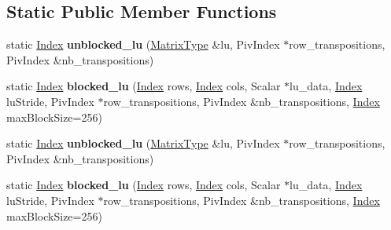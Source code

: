 \subsection*{Static Public Member Functions}
\begin{DoxyCompactItemize}
\item 
\mbox{\label{struct_eigen_1_1internal_1_1partial__lu__impl_abbae34180cea8ab2f3cee5def899d9fc}} 
static \hyperlink{namespace_eigen_a62e77e0933482dafde8fe197d9a2cfde}{Index} {\bfseries unblocked\+\_\+lu} (\hyperlink{group___core___module_class_eigen_1_1_block}{Matrix\+Type} \&lu, Piv\+Index $\ast$row\+\_\+transpositions, Piv\+Index \&nb\+\_\+transpositions)
\item 
\mbox{\label{struct_eigen_1_1internal_1_1partial__lu__impl_ab66f4cb2c3942d9c5a09aa4a26a15349}} 
static \hyperlink{namespace_eigen_a62e77e0933482dafde8fe197d9a2cfde}{Index} {\bfseries blocked\+\_\+lu} (\hyperlink{namespace_eigen_a62e77e0933482dafde8fe197d9a2cfde}{Index} rows, \hyperlink{namespace_eigen_a62e77e0933482dafde8fe197d9a2cfde}{Index} cols, Scalar $\ast$lu\+\_\+data, \hyperlink{namespace_eigen_a62e77e0933482dafde8fe197d9a2cfde}{Index} lu\+Stride, Piv\+Index $\ast$row\+\_\+transpositions, Piv\+Index \&nb\+\_\+transpositions, \hyperlink{namespace_eigen_a62e77e0933482dafde8fe197d9a2cfde}{Index} max\+Block\+Size=256)
\item 
\mbox{\label{struct_eigen_1_1internal_1_1partial__lu__impl_abbae34180cea8ab2f3cee5def899d9fc}} 
static \hyperlink{namespace_eigen_a62e77e0933482dafde8fe197d9a2cfde}{Index} {\bfseries unblocked\+\_\+lu} (\hyperlink{group___core___module_class_eigen_1_1_block}{Matrix\+Type} \&lu, Piv\+Index $\ast$row\+\_\+transpositions, Piv\+Index \&nb\+\_\+transpositions)
\item 
\mbox{\label{struct_eigen_1_1internal_1_1partial__lu__impl_ab66f4cb2c3942d9c5a09aa4a26a15349}} 
static \hyperlink{namespace_eigen_a62e77e0933482dafde8fe197d9a2cfde}{Index} {\bfseries blocked\+\_\+lu} (\hyperlink{namespace_eigen_a62e77e0933482dafde8fe197d9a2cfde}{Index} rows, \hyperlink{namespace_eigen_a62e77e0933482dafde8fe197d9a2cfde}{Index} cols, Scalar $\ast$lu\+\_\+data, \hyperlink{namespace_eigen_a62e77e0933482dafde8fe197d9a2cfde}{Index} lu\+Stride, Piv\+Index $\ast$row\+\_\+transpositions, Piv\+Index \&nb\+\_\+transpositions, \hyperlink{namespace_eigen_a62e77e0933482dafde8fe197d9a2cfde}{Index} max\+Block\+Size=256)
\end{DoxyCompactItemize}


